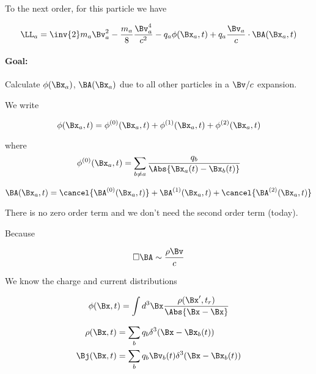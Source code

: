 To the next order, for this particle we have

\begin{equation}\label{eqn:relativisticElectrodynamicsL25:n}
\LL_a = \inv{2} m_a \Bv_a^2 - \frac{m_a}{8} \frac{\Bv_a^4}{c^2} - q_a \phi(\Bx_a, t) + q_a \frac{\Bv_a}{c} \cdot \BA(\Bx_a, t)
\end{equation}

\paragraph{Goal:} Calculate $\phi(\Bx_a)$, $\BA(\Bx_a)$ due to all other particles in a $\Bv/c$ expansion.

We write

\begin{equation}\label{eqn:relativisticElectrodynamicsL25:n}
\phi(\Bx_a, t) = 
\phi^{(0)}(\Bx_a, t)
+\phi^{(1)}(\Bx_a, t)
+\phi^{(2)}(\Bx_a, t)
\end{equation}

where
\begin{equation}\label{eqn:relativisticElectrodynamicsL25:n}
\phi^{(0)}(\Bx_a, t) = \sum_{b \ne a} \frac{q_b}{\Abs{\Bx_a(t) - \Bx_b(t)}}
\end{equation}

\begin{equation}\label{eqn:relativisticElectrodynamicsL25:n}
\BA(\Bx_a, t) = 
\cancel{\BA^{(0)}(\Bx_a, t)}
+\BA^{(1)}(\Bx_a, t)
+\cancel{\BA^{(2)}(\Bx_a, t)}
\end{equation}

There is no zero order term and we don't need the second order term (today).

Because

\begin{equation}\label{eqn:relativisticElectrodynamicsL25:n}
\square \BA \sim \frac{\rho \Bv}{c}
\end{equation}

We know the charge and current distributions

\begin{equation}\label{eqn:relativisticElectrodynamicsL25:n}
\phi(\Bx, t) = \int d^3 \Bx \frac{\rho(\Bx', t_r)}{\Abs{\Bx - \Bx}}
\end{equation}

\begin{align}\label{eqn:relativisticElectrodynamicsL25:n}
\rho(\Bx, t) &= \sum_b q_b \delta^3 (\Bx - \Bx_b(t)) \\
\Bj(\Bx, t) &= \sum_b q_b \Bv_b(t) \delta^3 (\Bx - \Bx_b(t))
\end{align}

